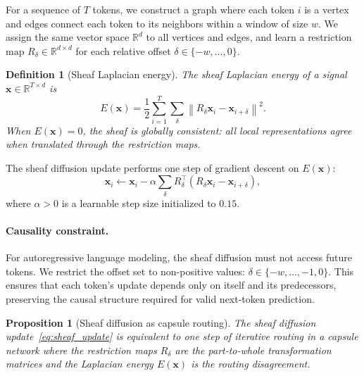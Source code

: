 \documentclass[11pt,a4paper]{article}
\newtheorem{proposition}[theorem]{Proposition}
\newtheorem{definition}[theorem]{Definition}
\newcommand{\R}{\mathbb{R}}
\newcommand{\norm}[1]{\left\lVert #1 \right\rVert}
\begin{document}
For a sequence of $T$ tokens, we construct a graph where each token
$i$ is a vertex and edges connect each token to its neighbors within
a window of size $w$.  We assign the same vector space $\R^d$ to all
vertices and edges, and learn a restriction map $R_\delta \in \R^{d
\times d}$ for each relative offset $\delta \in \{-w, \ldots, 0\}$.

\begin{definition}[Sheaf Laplacian energy]
The \emph{sheaf Laplacian energy} of a signal $\bm{x} \in \R^{T
\times d}$ is
\begin{equation}
E(\bm{x}) = \frac{1}{2} \sum_{i=1}^{T} \sum_{\delta}
  \norm{R_\delta \bm{x}_i - \bm{x}_{i+\delta}}^2.
\label{eq:sheaf_energy}
\end{equation}
When $E(\bm{x}) = 0$, the sheaf is \emph{globally consistent}: all
local representations agree when translated through the restriction maps.
\end{definition}

The sheaf diffusion update performs one step of gradient descent on
$E(\bm{x})$:
\begin{equation}
\bm{x}_i \leftarrow \bm{x}_i - \alpha \sum_{\delta}
  R_\delta^\top (R_\delta \bm{x}_i - \bm{x}_{i+\delta}),
\label{eq:sheaf_update}
\end{equation}
where $\alpha > 0$ is a learnable step size initialized to $0.15$.

\paragraph{Causality constraint.}
For autoregressive language modeling, the sheaf diffusion must not
access future tokens.  We restrict the offset set to non-positive
values: $\delta \in \{-w, \ldots, -1, 0\}$.  This ensures that each
token's update depends only on itself and its predecessors, preserving
the causal structure required for valid next-token prediction.

\begin{proposition}[Sheaf diffusion as capsule routing]
\label{prop:capsule}
The sheaf diffusion update~\eqref{eq:sheaf_update} is equivalent to
one step of iterative routing in a capsule network where the
restriction maps $R_\delta$ are the part-to-whole transformation
matrices and the Laplacian energy $E(\bm{x})$ is the routing
disagreement.
\end{proposition}
\end{document}
